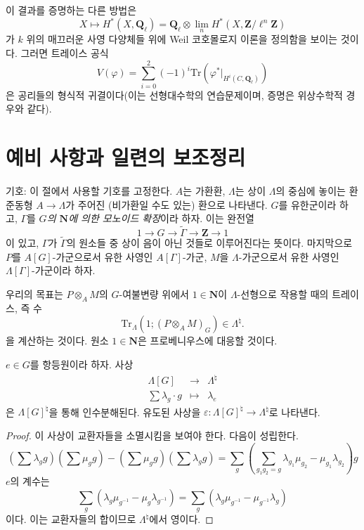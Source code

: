 \noindent
이 결과를 증명하는 다른 방법은
$$
X \mapsto H^* (X, \mathbf{Q}_\ell) =
\mathbf{Q}_\ell \otimes
\lim_n H^*(X, \mathbf{Z}/\ell^n\mathbf{Z})
$$
가 $k$ 위의 매끄러운 사영 다양체들 위에 Weil 코호몰로지 이론을
정의함을 보이는 것이다. 그러면 트레이스 공식
$$
V(\varphi) = \sum_{i = 0}^2 (-1)^i
\text{Tr}(\varphi^* |_{H^i(C, \mathbf{Q}_\ell)})
$$
은 공리들의 형식적 귀결이다(이는 선형대수학의 연습문제이며,
증명은 위상수학적 경우와 같다).




\section{예비 사항과 일련의 보조정리}
\label{section-preliminaries}

\noindent
기호:
이 절에서 사용할 기호를 고정한다. $A$는 가환환,
$\Lambda$는 상이 $\Lambda$의 중심에 놓이는 환 준동형
$A\to \Lambda$가 주어진 (비가환일 수도 있는) 환으로 나타낸다.
$G$를 유한군이라 하고, $\Gamma$를 {\it $G$의 $\mathbf{N}$에 의한
모노이드 확장}이라 하자. 이는 완전열
$$
1\to G\to \tilde\Gamma\to \mathbf{Z}\to 1
$$
이 있고, $\Gamma$가 $\tilde\Gamma$의 원소들 중 상이 음이 아닌
것들로 이루어진다는 뜻이다. 마지막으로 $P$를 $A[G]$-가군으로서
유한 사영인 $A[\Gamma]$-가군, $M$을 $\Lambda$-가군으로서 유한
사영인 $\Lambda[\Gamma]$-가군이라 하자.

\medskip\noindent
우리의 목표는 $P \otimes_A M$의 $G$-여불변량 위에서
$1 \in \mathbf{N}$이 $\Lambda$-선형으로 작용할 때의 트레이스,
즉 수
$$
\text{Tr}_{\Lambda}\left(1; \left(P \otimes_A M\right)_G\right) \in
\Lambda^\natural.
$$
을 계산하는 것이다. 원소 $1\in \mathbf{N}$은 프로베니우스에
대응할 것이다.

\begin{lemma}
\label{lemma-epsilon}
$e\in G$를 항등원이라 하자. 사상
$$
\begin{matrix}
\Lambda[G] & \longrightarrow & \Lambda^{\natural}\\
\sum \lambda_g\cdot g & \longmapsto & \lambda_e
\end{matrix}
$$
은 $\Lambda[G]^\natural$을 통해 인수분해된다. 유도된 사상을
$\varepsilon : \Lambda[G]^\natural\to \Lambda^\natural$로 나타낸다.
\end{lemma}

\begin{proof}
이 사상이 교환자들을 소멸시킴을 보여야 한다. 다음이 성립한다.
$$
\left(\sum\lambda_g g\right)\left(\sum\mu_g g\right)-\left(\sum \mu_g
g\right)\left(\sum\lambda_g g\right)
= \sum_g\left(\sum_{g_1g_2=g}
\lambda_{g_1}\mu_{g_2}-\mu_{g_1}\lambda_{g_2}\right)g
$$
$e$의 계수는
$$
\sum_g\left(\lambda_g\mu_{g^{-1}}-\mu_g\lambda_{g^{-1}}\right) =
\sum_g\left(\lambda_g\mu_{g^{-1}}-\mu_{g^{-1}}\lambda_g\right)
$$
이다. 이는 교환자들의 합이므로 $\Lambda^\natural$에서 영이다.
\end{proof}

